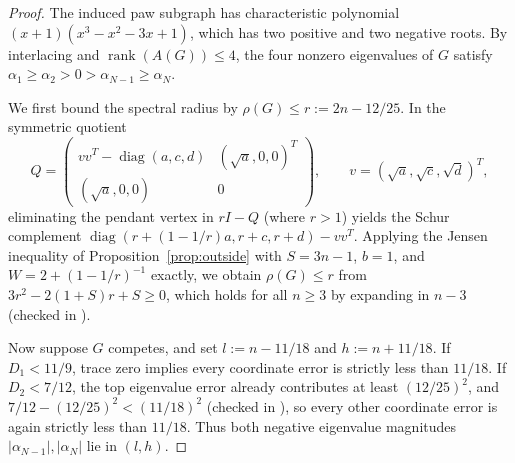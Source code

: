 \documentclass[10pt]{article}
\begin{document}
\begin{proof}
The induced paw subgraph has characteristic polynomial $(x + 1)(x^3 - x^2 - 3x + 1)$, which has two positive and two negative roots. By interlacing and $\operatorname{rank}(A(G)) \leq 4$, the four nonzero eigenvalues of $G$ satisfy $\alpha_1 \geq \alpha_2 > 0 > \alpha_{N-1} \geq \alpha_N$.

We first bound the spectral radius by $\rho(G) \leq r := 2n - 12/25$. In the symmetric quotient
\[
Q = \begin{pmatrix}
vv^T - \operatorname{diag}(a, c, d) & (\sqrt{a}, 0, 0)^T \\
(\sqrt{a}, 0, 0) & 0
\end{pmatrix}, \qquad v = (\sqrt{a}, \sqrt{c}, \sqrt{d})^T,
\]
eliminating the pendant vertex in $rI - Q$ (where $r > 1$) yields the Schur complement $\operatorname{diag}(r + (1 - 1/r)a, r + c, r + d) - vv^T$. Applying the Jensen inequality of Proposition~\ref{prop:outside} with $S = 3n - 1$, $b = 1$, and $W = 2 + (1 - 1/r)^{-1}$ exactly, we obtain $\rho(G) \leq r$ from $3r^2 - 2(1 + S)r + S \geq 0$, which holds for all $n \geq 3$ by expanding in $n - 3$ (checked in \texttt{}).

Now suppose $G$ competes, and set $l := n - 11/18$ and $h := n + 11/18$. If $D_1 < 11/9$, trace zero implies every coordinate error is strictly less than $11/18$. If $D_2 < 7/12$, the top eigenvalue error already contributes at least $(12/25)^2$, and $7/12 - (12/25)^2 < (11/18)^2$ (checked in \texttt{}), so every other coordinate error is again strictly less than $11/18$. Thus both negative eigenvalue magnitudes $|\alpha_{N-1}|, |\alpha_N|$ lie in $(l, h)$.


\end{proof}
\end{document}

